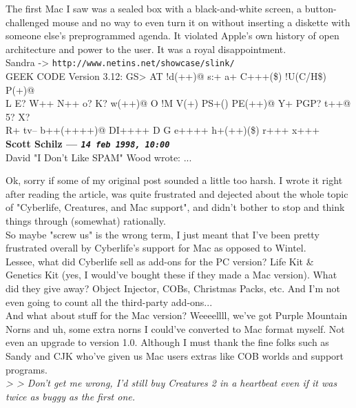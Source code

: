 \documentclass[11pt,twoside,a4paper]{article}
\begin{document}
\begin{multicols*}{2}
The first Mac I saw was a sealed box with a black-and-white screen, a button-challenged mouse and no way to even turn it on without inserting a diskette with someone else's preprogrammed agenda.  It violated Apple's own history of open architecture and power to the user.  It was a royal disappointment.~\\

Sandra -> \texttt{http://www.netins.net/showcase/slink/}~\\
GEEK CODE Version 3.12: GS> AT !d(++)@ s:+ a+ C+++(\$) !U(C/H\$) P(+)@~\\
L E? W++ N++ o? K? w(++)@ O !M V(+) PS+() PE(++)@ Y+ PGP? t++@ 5? X?~\\
R+ tv-- b++(++++)@ DI++++ D G e++++ h+(++)(\$) r+++ x+++~\\

 
		
	
		
\textbf{Scott Schilz --- \emph{\texttt{14 feb 1998, 10:00}}}~\\

David "I Don't Like SPAM" Wood wrote:
...

Ok, sorry if some of my original post sounded a little too harsh. I wrote it right after reading the article, was quite frustrated and dejected about the whole topic of "Cyberlife, Creatures, and Mac support", and didn't bother to stop and think things through (somewhat) rationally.~\\
So maybe "screw us" is the wrong term, I just meant that I've been pretty frustrated overall by Cyberlife's support for Mac as opposed to Wintel.~\\
Lessee, what did Cyberlife sell as add-ons for the PC version? Life Kit \& Genetics Kit (yes, I would've bought these if they made a Mac version). What did they give away? Object Injector, COBs, Christmas Packs, etc. And I'm not even going to count all the third-party add-ons...~\\
And what about stuff for the Mac version? Weeeellll, we've got Purple Mountain Norns and uh, some extra norns I could've converted to Mac format myself. Not even an upgrade to version 1.0. Although I must thank the fine folks such as Sandy and CJK who've given us Mac users extras like COB worlds and support programs.~\\

\emph{> > Don't get me wrong, I'd still buy Creatures 2 in a heartbeat even if it was twice as buggy as the first one.}~\\


\end{multicols*}
\end{document}
